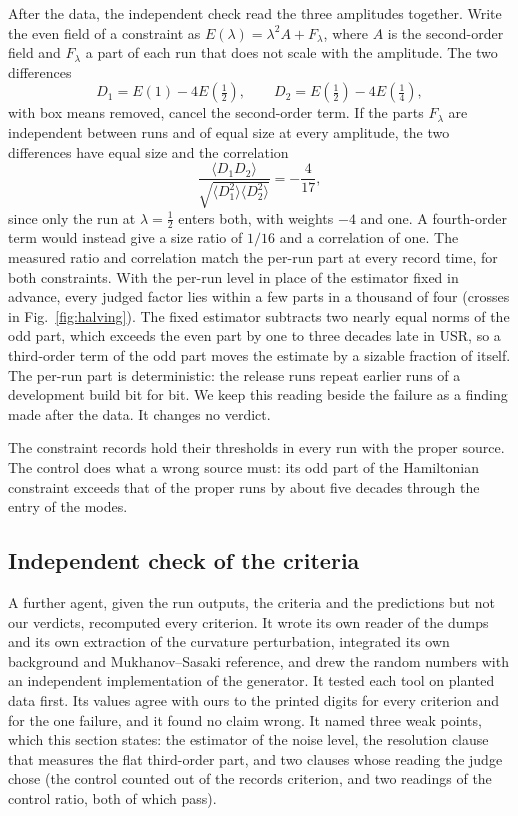 \documentclass[aps,prd,twocolumn,10pt,superscriptaddress,nofootinbib,longbibliography,floatfix]{revtex4-2}
\begin{document}
After the data, the independent check read the three amplitudes together. Write the even field of a constraint as $E(\lambda) = \lambda^2 A + F_\lambda$, where $A$ is the second-order field and $F_\lambda$ a part of each run that does not scale with the amplitude. The two differences
\begin{equation}
D_1 = E(1) - 4E(\tfrac12), \qquad D_2 = E(\tfrac12) - 4E(\tfrac14),
\label{eq:dstat}
\end{equation}
with box means removed, cancel the second-order term. If the parts $F_\lambda$ are independent between runs and of equal size at every amplitude, the two differences have equal size and the correlation
\begin{equation}
\frac{\langle D_1 D_2\rangle}{\sqrt{\langle D_1^2\rangle\langle D_2^2\rangle}} = -\frac{4}{17} ,
\label{eq:corr}
\end{equation}
since only the run at $\lambda = \frac12$ enters both, with weights $-4$ and one. A fourth-order term would instead give a size ratio of $1/16$ and a correlation of one. The measured ratio and correlation match the per-run part at every record time, for both constraints. With the per-run level in place of the estimator fixed in advance, every judged factor lies within a few parts in a thousand of four (crosses in Fig.~\ref{fig:halving}). The fixed estimator subtracts two nearly equal norms of the odd part, which exceeds the even part by one to three decades late in USR, so a third-order term of the odd part moves the estimate by a sizable fraction of itself. The per-run part is deterministic: the release runs repeat earlier runs of a development build bit for bit. We keep this reading beside the failure as a finding made after the data. It changes no verdict.

The constraint records hold their thresholds in every run with the proper source. The control does what a wrong source must: its odd part of the Hamiltonian constraint exceeds that of the proper runs by about five decades through the entry of the modes.

\subsection{Independent check of the criteria}\label{sec:g2check}

A further agent, given the run outputs, the criteria and the predictions but not our verdicts, recomputed every criterion. It wrote its own reader of the dumps and its own extraction of the curvature perturbation, integrated its own background and Mukhanov--Sasaki reference, and drew the random numbers with an independent implementation of the generator. It tested each tool on planted data first. Its values agree with ours to the printed digits for every criterion and for the one failure, and it found no claim wrong. It named three weak points, which this section states: the estimator of the noise level, the resolution clause that measures the flat third-order part, and two clauses whose reading the judge chose (the control counted out of the records criterion, and two readings of the control ratio, both of which pass).
\end{document}
